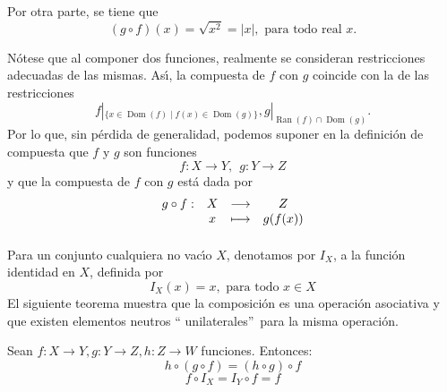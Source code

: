\begin{example}
Por otra parte, se tiene que
\[
(g\circ f)(x)=\sqrt{x^{2}}=|x|,\mbox{ \ para todo real \ }x.
\]

\end{example}

\begin{remark}
N\'{o}tese que al componer dos funciones, realmente se consideran
restricciones adecuadas de las mismas. As\'{\i}, la compuesta de $f$ con $g$
coincide con la de las restricciones
\[
f|_{\{x\in\operatorname*{Dom}(f)\mid f(x)\in\operatorname*{Dom}(g)\}}%
,g|_{\operatorname*{Ran}(f)\cap\operatorname*{Dom}(g)}.
\]
Por lo que, sin p\'{e}rdida de generalidad, podemos suponer en la
definici\'{o}n de compuesta que $f$ y $g$ son funciones
\[
f:X\longrightarrow Y,\ \ g:Y\longrightarrow Z
\]
y que la compuesta de $f$ con $g$ est\'{a} dada por
\[%
\begin{array}
[c]{cccc}%
g\circ f: & X & \longrightarrow & Z\\
& x & \longmapsto & g(f(x))
\end{array}
\]

\end{remark}

\paragraph{}

Para un conjunto cualquiera no vac\'{\i}o $X$, denotamos por $I_{X}$, a la
funci\'{o}n identidad%
en $X$, definida por
\begin{equation}
I_{X}(x)=x,\mbox{ \ para todo \ }x\in X \label{identidadX}%
\end{equation}
El siguiente teorema muestra que la composici\'{o}n es una operaci\'{o}n
asociativa y que existen elementos neutros \textquotedblleft
unilaterales\textquotedblright\ para la misma operaci\'{o}n.

\begin{theorem}
\label{compuestaasociativa} Sean $f:X\longrightarrow Y,g:Y\longrightarrow
Z,h:Z\longrightarrow W$ funciones. Entonces:
\begin{equation}
h\circ(g\circ f)=(h\circ g)\circ f \label{asociacompuesta}%
\end{equation}%
\begin{equation}
f\circ I_{X}=I_{Y}\circ f=f \label{neutrocompuesta}%
\end{equation}

\end{theorem}

